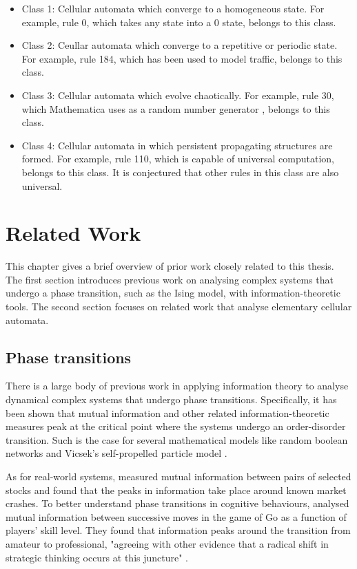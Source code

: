 \documentclass[12pt]{article}
\begin{document}
\begin{itemize}
\item Class 1: Cellular automata which converge to a homogeneous state. For example, rule 0, which takes any state into a 0 state, belongs to this class.
\item Class 2: Ceullar automata which converge to a repetitive or periodic state. For example, rule 184, which has been used to model traffic, belongs to this class.
\item Class 3: Cellular automata which evolve chaotically. For example, rule 30, which Mathematica uses as a random number generator \cite{NKS}, belongs to this class.
\item Class 4: Cellular automata in which persistent propagating structures are formed. For example, rule 110, which is capable of universal computation, belongs to this class. It is conjectured that other rules in this class are also universal. 
\end{itemize}

\newpage
\section{Related Work} 

This chapter gives a brief overview of prior work closely related to this thesis. The first section introduces previous work on analysing complex systems that undergo a phase transition, such as the Ising model, with information-theoretic tools. The second section focuses on related work that analyse elementary cellular automata.    

\subsection{Phase transitions}

There is a large body of previous work in applying information theory to analyse dynamical complex systems that undergo phase transitions. Specifically, it has been shown that mutual information and other related information-theoretic measures peak at the critical point where the systems undergo an order-disorder transition. Such is the case for several mathematical models like random boolean networks \cite{lizier-rand-bool-nets} and Vicsek's self-propelled particle model \cite{mi-swarms}. 

As for real-world systems, \cite{mi-financial-markets} measured mutual information between pairs of selected stocks and found that the peaks in information take place around known market crashes. To better understand phase transitions in cognitive behaviours, \cite{mi-go} analysed mutual information between successive moves in the game of Go as a function of players' skill level. They found that information peaks around the transition from amateur to professional, "agreeing with other evidence that a radical shift in strategic thinking occurs at this juncture" \cite{mi-social-systems}. 
\end{document}
